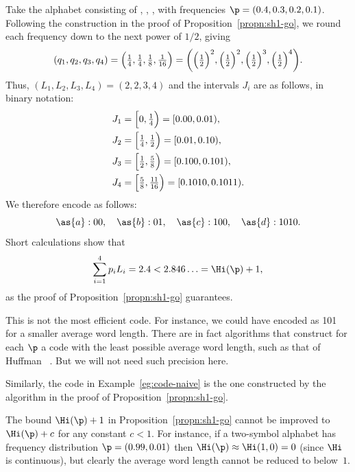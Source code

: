 \begin{example}
Take the alphabet consisting of , , ,  with
frequencies $\p = (0.4, 0.3, 0.2, 0.1)$.  Following the construction in the
proof of Proposition~\ref{propn:sh1-go}, we round each frequency down to
the next power of $1/2$, giving
\[
(q_1, q_2, q_3, q_4)
=
\Bigl(\tfrac{1}{4}, \tfrac{1}{4}, \tfrac{1}{8}, \tfrac{1}{16}\Bigr)
=
\biggl( \Bigl(\tfrac{1}{2}\Bigr)^2, 
\Bigl(\tfrac{1}{2}\Bigr)^2, 
\Bigl(\tfrac{1}{2}\Bigr)^3, 
\Bigl(\tfrac{1}{2}\Bigr)^4 
\biggr).
\]
Thus, $(L_1, L_2, L_3, L_4) = (2, 2, 3, 4)$ and the intervals $J_i$ are as
follows, in binary notation:
% 
\begin{align*}
J_1     &
=
\Bigl[0, \tfrac{1}{4}\Bigr)     
=
[0.00, 0.01),   \\
J_2     &
=
\Bigl[\tfrac{1}{4}, \tfrac{1}{2}\Bigr)     
=
[0.01, 0.10),   \\
J_3     &
=
\Bigl[\tfrac{1}{2}, \tfrac{5}{8}\Bigr)     
=
[0.100, 0.101),   \\
J_4     &
=
\Bigl[\tfrac{5}{8}, \tfrac{11}{16}\Bigr)     
=
[0.1010, 0.1011).
\end{align*}
% 
We therefore encode as follows:
\[
\as{a}: 00,
\quad
\as{b}: 01, 
\quad
\as{c}: 100,
\quad
\as{d}: 1010.
\]
Short calculations show that
\[
\sum_{i = 1}^4 p_i L_i
=
2.4 
< 
2.846\ldots
=
\Hi(\p) + 1,
\]
as the proof of Proposition~\ref{propn:sh1-go} guarantees.

This is not the most efficient code. For instance, we could have encoded
 as 101 for a smaller average word length.  There are in fact
algorithms that construct for each $\p$ a code with the least possible
average word length, such as that of Huffman~\cite{Huff}%
%
.  
% 
But we will not need such precision here.
\end{example}

\begin{example}
Similarly, the code in Example~\ref{eg:code-naive} is the one constructed
by the algorithm in the proof of Proposition~\ref{propn:sh1-go}.
\end{example}

\begin{remark}
The bound $\Hi(\p) + 1$ in Proposition~\ref{propn:sh1-go} cannot be
improved to $\Hi(\p) + c$ for any constant $c < 1$.  For instance, if a
two-symbol alphabet has frequency distribution $\p = (0.99, 0.01)$ then
$\Hi(\p) \approx \Hi(1, 0) = 0$ (since $\Hi$ is continuous), but clearly
the average word length cannot be reduced to below~$1$.
\end{remark}

